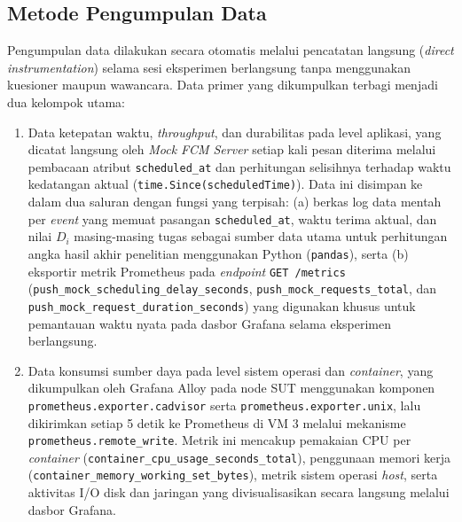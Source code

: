 \subsection{Metode Pengumpulan Data} \label{III.Pengumpulan_Data}
Pengumpulan data dilakukan secara otomatis melalui pencatatan langsung (\textit{direct instrumentation}) selama sesi eksperimen berlangsung tanpa menggunakan kuesioner maupun wawancara. Data primer yang dikumpulkan terbagi menjadi dua kelompok utama: \par
\begin{enumerate}[noitemsep]
	\item Data ketepatan waktu, \textit{throughput}, dan durabilitas pada level aplikasi, yang dicatat langsung oleh \textit{Mock FCM Server} setiap kali pesan diterima melalui pembacaan atribut \texttt{scheduled\_at} dan perhitungan selisihnya terhadap waktu kedatangan aktual (\texttt{time.Since(scheduledTime)}). Data ini disimpan ke dalam dua saluran dengan fungsi yang terpisah: (a) berkas log data mentah per \textit{event} yang memuat pasangan \texttt{scheduled\_at}, waktu terima aktual, dan nilai $D_i$ masing-masing tugas sebagai sumber data utama untuk perhitungan angka hasil akhir penelitian menggunakan Python (\texttt{pandas}), serta (b) eksportir metrik Prometheus pada \textit{endpoint} \texttt{GET /metrics} (\texttt{push\_mock\_scheduling\_delay\_seconds}, \texttt{push\_mock\_requests\_total}, dan \texttt{push\_mock\_request\_duration\_seconds}) yang digunakan khusus untuk pemantauan waktu nyata pada dasbor Grafana selama eksperimen berlangsung.
	\item Data konsumsi sumber daya pada level sistem operasi dan \textit{container}, yang dikumpulkan oleh Grafana Alloy pada node SUT menggunakan komponen \texttt{prometheus.exporter.cadvisor} serta \texttt{prometheus.exporter.unix}, lalu dikirimkan setiap 5 detik ke Prometheus di VM 3 melalui mekanisme \texttt{prometheus.remote\_write}. Metrik ini mencakup pemakaian CPU per \textit{container} (\texttt{container\_cpu\_usage\_seconds\_total}), penggunaan memori kerja (\texttt{container\_memory\_working\_set\_bytes}), metrik sistem operasi \textit{host}, serta aktivitas I/O disk dan jaringan yang divisualisasikan secara langsung melalui dasbor Grafana.
\end{enumerate}

